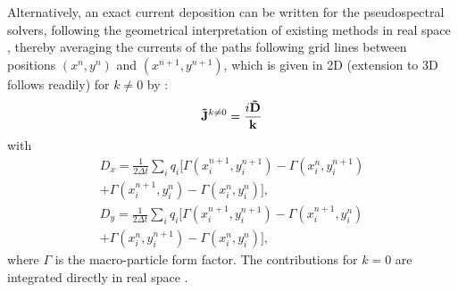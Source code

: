 Alternatively, an exact current deposition can be written for the pseudospectral solvers, following the geometrical interpretation of existing methods in real space \cite{MorseNielson1971,VillasenorCPC92,Esirkepovcpc01}, thereby averaging the currents of the paths following grid lines between positions $(x^n,y^n)$ and $(x^{n+1},y^{n+1})$, which is given in 2D (extension to 3D follows readily) for $k\neq0$ by  \cite{VayJCP2013}:
%
\begin{eqnarray}
\mathbf{\tilde{J}}^{k\neq0}=\frac{i\mathbf{\tilde{D}}}{\mathbf{k}}
\label{Eq_Jdep_1}
\end{eqnarray}
with 
\begin{eqnarray}
D_x   =  \frac{1}{2\Delta t}\sum_i q_i
  [\Gamma(x_i^{n+1},y_i^{n+1})-\Gamma(x_i^{n},y_i^{n+1}) \nonumber\\ 
+\Gamma(x_i^{n+1},y_i^{n})-\Gamma(x_i^{n},y_i^{n})],\\
D_y   =  \frac{1}{2\Delta t}\sum_i q_i
  [\Gamma(x_i^{n+1},y_i^{n+1})-\Gamma(x_i^{n+1},y_i^{n}) \nonumber \\
+\Gamma(x_i^{n},y_i^{n+1})-\Gamma(x_i^{n},y_i^{n})],
\end{eqnarray}
where $\Gamma$ is the macro-particle form factor. 
%
The contributions for $k=0$ are integrated directly in real space  \cite{VayJCP2013}.
